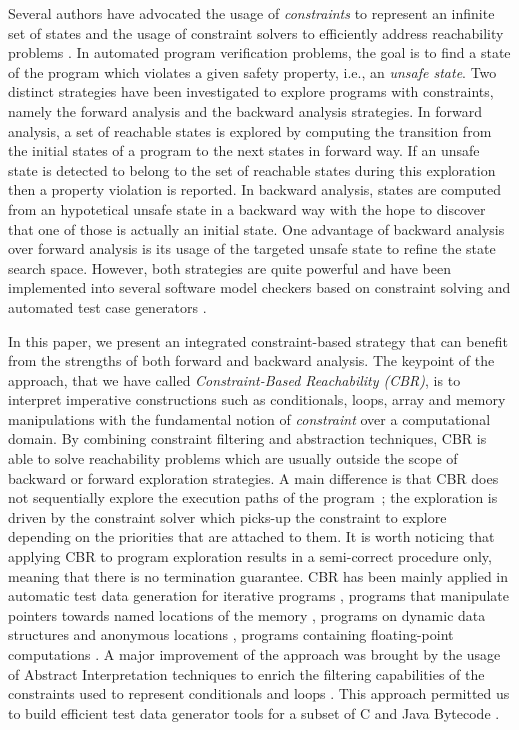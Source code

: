 \documentclass[submission,copyright,creativecommons]{eptcs}
\begin{document}
Several authors have advocated the usage of {\it constraints} to represent an infinite set of states and the usage of constraint solvers to efficiently address reachability problems \cite{Car96,DP01,Fla04,BCE08}. In automated program verification problems, the goal is to find a state of the program which violates a given safety property, i.e., an {\it unsafe state}. Two distinct strategies have been investigated to explore programs with constraints, namely the forward analysis and the backward analysis strategies. In forward analysis, a set of reachable states is explored by computing the transition from the initial states of a program to the next states in forward way. If an unsafe state is detected to belong to the set of reachable states during this exploration then a property violation is reported. In backward analysis, states are computed from an hypotetical unsafe state in a backward way with the hope to discover that one of those is actually an initial state. One advantage of backward analysis over forward analysis is its usage of the targeted unsafe state to refine the state search space.  
However, both strategies are quite powerful and have been implemented into several software model checkers based on constraint solving \cite{HJM03,Fla04} and automated test case generators \cite{WMM05,GKS05,FW07,CG10,BH11}.
 
In this paper, we present an integrated constraint-based strategy that can benefit from the strengths of both forward and backward analysis. The keypoint of the approach, that we have called {\it Constraint-Based Reachability (CBR)}, is to interpret imperative constructions such as conditionals, loops, array and memory manipulations with the fundamental notion of {\it constraint} over a computational domain. By combining constraint filtering and abstraction techniques, CBR is able to solve reachability problems which are usually outside the scope of backward or forward exploration strategies. A main difference is that CBR does not sequentially explore the execution paths of the program~; the exploration is driven by the constraint solver which picks-up the constraint to explore depending on the priorities that are attached to them. It is worth noticing that applying CBR to program exploration results in a semi-correct procedure only, meaning that there is no termination guarantee. CBR has been mainly applied in automatic test data generation for iterative programs \cite{GBR98,GBR00}, programs that manipulate pointers towards named locations of the memory \cite{GDB05b,GDB07}, programs on dynamic data structures and anonymous locations \cite{CBG09}, programs containing floating-point computations \cite{BGM06}. A major improvement of the approach was brought by the usage of Abstract Interpretation techniques to enrich the filtering capabilities of the constraints used to represent conditionals and loops \cite{DGD07a,DGD07b}. This approach permitted us to build efficient test data generator tools for a subset of C \cite{Got09} and Java Bytecode \cite{CG10}.
\end{document}
